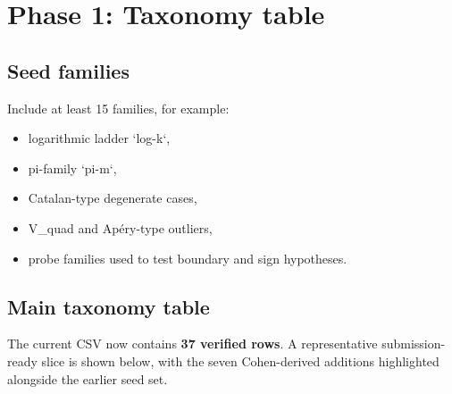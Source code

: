 \documentclass[11pt]{article}
\begin{document}
\section{Phase 1: Taxonomy table}
\subsection{Seed families}
Include at least 15 families, for example:
\begin{itemize}
  \item logarithmic ladder `log-k`,
  \item pi-family `pi-m`,
  \item Catalan-type degenerate cases,
  \item V\_quad and Ap\'ery-type outliers,
  \item probe families used to test boundary and sign hypotheses.
\end{itemize}

\subsection{Main taxonomy table}
The current CSV now contains \textbf{37 verified rows}. A representative submission-ready slice is shown below, with the seven Cohen-derived additions highlighted alongside the earlier seed set.
\end{document}
